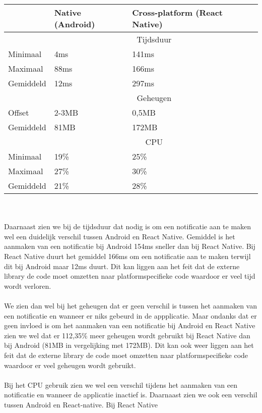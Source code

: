 \begin{tabular}{ |p{3cm}||p{5cm}|p{5cm}| }
    \hline
     & Native (Android) & Cross-platform (React Native) \\
    \hline
     & \multicolumn{2}{|c|}{Tijdsduur} \\
    \hline
    Minimaal & 4ms & 141ms \\
    Maximaal & 88ms & 166ms \\
    Gemiddeld & 12ms & 297ms \\
    \hline
     & \multicolumn{2}{|c|}{Geheugen} \\ 
    \hline
    Offset & 2-3MB & 0,5MB \\
    Gemiddeld & 81MB & 172MB \\
    \hline
     & \multicolumn{2}{|c|}{CPU} \\
    \hline
    Minimaal & 19\% & 25\% \\
    Maximaal & 27\% & 30\% \\
    Gemiddeld & 21\% & 28\% \\
    \hline
\end{tabular}
\\\\
Daarnaast zien we bij de tijdsduur dat nodig is om een notificatie aan te maken wel een duidelijk 
verschil tussen Android en React Native. Gemiddel is het aanmaken van een notificatie bij Android
154ms sneller dan bij React Native. Bij React Native duurt het gemiddel 166ms om een notificatie 
aan te maken terwijl dit bij Android maar 12ms duurt. Dit kan liggen aan het feit dat de externe 
library de code moet omzetten naar platformspecifieke code waardoor er veel tijd wordt verloren.
\\\\
We zien dan wel bij het geheugen dat er geen verschil is tussen het aanmaken van een notificatie en wanneer er 
niks gebeurd in de appplicatie. Maar ondanks dat er geen invloed is om het aanmaken van een notificatie bij 
Android en React Native zien we wel dat er 112,35\% meer geheugen wordt gebruikt bij React Native dan 
bij Android (81MB in vergelijking met 172MB). Dit kan ook weer liggen aan het feit dat de externe library
de code moet omzetten naar platformspecifieke code waardoor er veel geheugen wordt gebruikt.
\\\\
Bij het CPU gebruik zien we wel een verschil tijdens het aanmaken van een notificatie en wanneer de 
applicatie inactief is. Daarnaast zien we ook een verschil tussen Android en React-native. Bij React Native 
